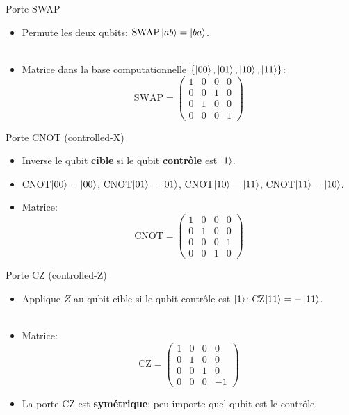 \documentclass[aspectratio=169,12pt]{beamer}
\begin{document}
\begin{frame}{Porte SWAP}
  \begin{itemize}[<+->]
    \setlength{\itemsep}{0.55em}
    \item Permute les deux qubits: $\text{SWAP}\ket{ab} = \ket{ba}$.\\~\\
    \item Matrice dans la base computationnelle $\{\ket{00},\ket{01},\ket{10},\ket{11}\}$:
    $$\text{SWAP} = \begin{pmatrix} 1&0&0&0 \\ 0&0&1&0 \\ 0&1&0&0 \\ 0&0&0&1 \end{pmatrix}$$
  \end{itemize}
\end{frame}

\begin{frame}{Porte CNOT (controlled-X)}
    \begin{itemize}[<+->]
      \setlength{\itemsep}{0.55em}
      \item Inverse le qubit \textbf{cible} si le qubit \textbf{contrôle} est $\ket{1}$.
      \item CNOT$\ket{00}=\ket{00}$, CNOT$\ket{01}=\ket{01}$,
       CNOT$\ket{10}=\ket{11}$, CNOT$\ket{11}=\ket{10}$.
      \item Matrice:
      $$\text{CNOT} = \begin{pmatrix} 1&0&0&0 \\ 0&1&0&0 \\ 0&0&0&1 \\ 0&0&1&0 \end{pmatrix}$$
    \end{itemize}
\end{frame}

\begin{frame}{Porte CZ (controlled-Z)}
  \begin{itemize}[<+->]
    \setlength{\itemsep}{0.55em}
    \item Applique $Z$ au qubit cible si le qubit contrôle est $\ket{1}$:
     CZ$\ket{11} = -\ket{11}$.\\~\\
    \item Matrice:
    $$\text{CZ} = \begin{pmatrix} 1&0&0&0 \\ 0&1&0&0 \\ 0&0&1&0 \\ 0&0&0&-1 \end{pmatrix}$$
    \item La porte CZ est \textbf{symétrique}: peu importe quel qubit est le contrôle.
  \end{itemize}
\end{frame}
\end{document}
